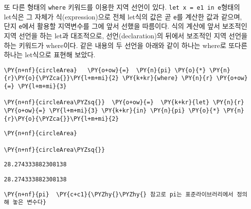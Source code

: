     
    또 다른 형태의 \texttt{where} 키워드를 이용한 지역 선언이 있다.
\texttt{let\ x\ =\ e1\ in\ e}형태의 let식은 그 자체가 식(expression)으로
전체 let식의 값은 곧 \texttt{e}를 계산한 값과 같으며, 단지
\texttt{e}에서 활용할 지역변수를 그에 앞서 선했을 따름이다. 식의 계산에
앞서 보조적인 지역 선언을 하는 let과 대조적으로, 선언(declaration)의
뒤에서 보조적인 지역 선언을 하는 키워드가 where이다. 같은 내용의 두
선언을 아래와 같이 하나는 where로 또다른 하나는 let식으로 표현해 보았다.

    \begin{tcolorbox}[breakable, size=fbox, boxrule=1pt, pad at break*=1mm,colback=cellbackground, colframe=cellborder, top=.75ex]
\begin{Verbatim}[commandchars=\\\{\}]
\PY{n+nf}{circleArea}   \PY{o+ow}{=}  \PY{n}{pi} \PY{o}{*} \PY{n}{r}\PY{o}{\PYZca{}}\PY{l+m+mi}{2} \PY{k+kr}{where} \PY{n}{r} \PY{o+ow}{=} \PY{l+m+mi}{3}

\PY{n+nf}{circleArea\PYZsq{}}  \PY{o+ow}{=}  \PY{k+kr}{let} \PY{n}{r} \PY{o+ow}{=} \PY{l+m+mi}{3} \PY{k+kr}{in} \PY{n}{pi} \PY{o}{*} \PY{n}{r}\PY{o}{\PYZca{}}\PY{l+m+mi}{2}
\end{Verbatim}
\end{tcolorbox}

    \begin{tcolorbox}[breakable, size=fbox, boxrule=1pt, pad at break*=1mm,colback=cellbackground, colframe=cellborder, top=.75ex]
\begin{Verbatim}[commandchars=\\\{\}]
\PY{n+nf}{circleArea}

\PY{n+nf}{circleArea\PYZsq{}}
\end{Verbatim}
\end{tcolorbox}

    
    \begin{Verbatim}[commandchars=\\\{\}]
28.274333882308138
    \end{Verbatim}

    
    
    \begin{Verbatim}[commandchars=\\\{\}]
28.274333882308138
    \end{Verbatim}

    
    \begin{tcolorbox}[breakable, size=fbox, boxrule=1pt, pad at break*=1mm,colback=cellbackground, colframe=cellborder, top=.75ex]
\begin{Verbatim}[commandchars=\\\{\}]
\PY{n+nf}{pi}  \PY{c+c1}{\PYZhy{}\PYZhy{} 참고로 pi는 표준라이브러리에서 정의해 놓은 변수다}
\end{Verbatim}
\end{tcolorbox}

